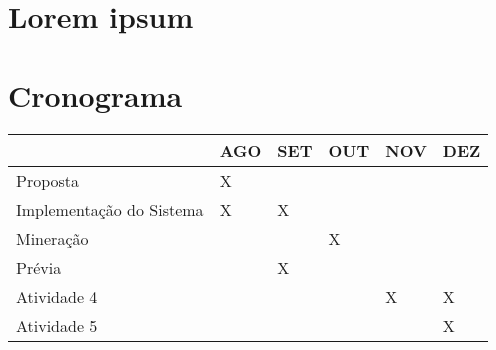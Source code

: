 \documentclass[projtg]{mdtufsm}
\begin{document}
\chapter{Lorem ipsum}

    
\chapter{Cronograma}
\begin{tabu} to 0.9\linewidth{|X[6]|X|X|X|X|X|}
	\hline
	& AGO & SET & OUT & NOV & DEZ \\
	\hline
	Proposta & X & & & & \\
	\hline
	Implementação do Sistema & X & X & & & \\
	\hline
	Mineração & & & X & & \\
	\hline
	Prévia & & X & & & \\
	\hline
	Atividade 4 & & & & X & X \\
	\hline
	Atividade 5 & & & & & X \\
	\hline
\end{tabu}
 
\setlength{\baselineskip}{\baselineskip}



\end{document}
